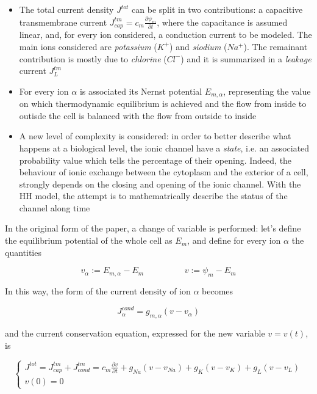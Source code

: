 \documentclass[a4paper]{article}
\begin{document}
\begin{itemize}
	
	\item The total current density $J^{tot}$ can be split in two contributions: a capacitive transmembrane current $J_{cap}^{tm} = c_m \frac{\partial \psi_m}{\partial t}$, where the capacitance is assumed linear, and, for every ion considered, a conduction current to be modeled. The main ions considered are \textit{potassium} ($K^+$) and \textit{siodium} ($Na^+$). The remainant contribution is mostly due to \textit{chlorine} ($Cl^-$) and it is summarized in a \textit{leakage} current $J_L^{tm}$
	
	\item For every ion $\alpha$ is associated its Nernst potential $E_{m,\alpha}$, representing the value on which thermodynamic equilibrium is achieved and the flow from inside to outisde the cell is balanced with the flow from outside to inside
	
	\item A new level of complexity is considered: in order to better describe what happens at a biological level, the ionic channel have a \textit{state}, i.e. an associated probability value which tells the percentage of their opening. Indeed, the behaviour of ionic exchange between the cytoplasm and the exterior of a cell, strongly depends on the closing and opening of the ionic channel. With the HH model, the attempt is to mathematrically describe the status of the channel along time
	
	
\end{itemize}	


In the original form of the paper, a change of variable is performed: let's define the equilibrium potential of the whole cell as $E_m$, and define for every ion $\alpha$ the quantities

\begin{equation}
v_\alpha := E_{m,\alpha} - E_m \hspace{2cm}  v := \psi_m - E_m
\end{equation}

In this way, the form of the current density of ion $\alpha$ becomes


\begin{equation}
J_\alpha^{cond} = g_{m,\alpha}(v-v_\alpha)
\end{equation}

and the current conservation equation, expressed for the new variable $v = v(t)$, is

\begin{equation}	
\begin{cases}
J^{tot} = J_{cap}^{tm} + J_{cond}^{tm} = c_m \frac{\partial v}{\partial t} + g_{Na}(v - v_{Na}) + g_{K}(v - v_{K}) +g_{L}(v - v_{L})  \\
v(0) = 0
\end{cases}	\end{equation}
\end{document}
